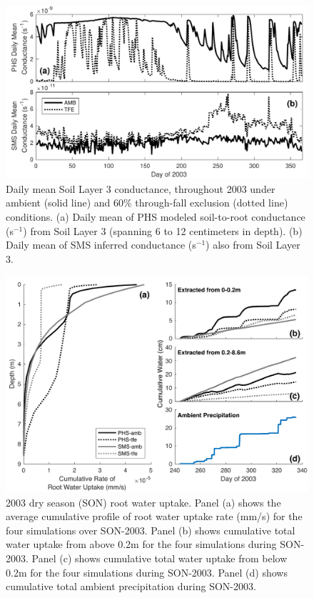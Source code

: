 \documentclass[draft,linenumbers]{agujournal}
\begin{document}
  \clearpage   
  \begin{figure}[h]
     \centering
     \includegraphics[width=30pc]{../figs2/fig6a.pdf}
     \caption{Daily mean Soil Layer 3 conductance, throughout 2003 under ambient (solid line) and 60\% through-fall exclusion (dotted line) conditions.
     (a) Daily mean of PHS modeled soil-to-root conductance (s$^{-1}$) from Soil Layer 3 (spanning 6 to 12 centimeters in depth).
     (b) Daily mean of SMS inferred conductance (s$^{-1}$) also from Soil Layer 3.
     }
     \label{fig:cond2}
  \end{figure}
  
        \clearpage
    \begin{figure}[h]
     \centering
     \includegraphics[width=30pc]{../figs2/fig7.pdf}
     \caption{2003 dry season (SON) root water uptake. 
     Panel (a) shows the average cumulative profile of root water uptake rate (mm/s) for the four simulations over SON-2003.
     Panel (b) shows cumulative total  water uptake from above 0.2m for the four simulations during SON-2003.
     Panel (c) shows cumulative total water uptake from below 0.2m for the four simulations during SON-2003. 
     Panel (d) shows cumulative total ambient precipitation during SON-2003.
     }
     \label{fig7}
  \end{figure}
  
\end{document}

